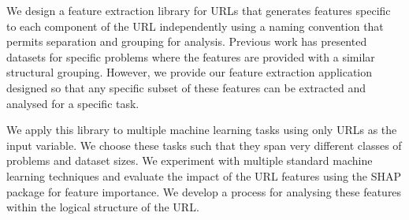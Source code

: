 \documentclass{aircc}
\begin{document}
\begin{table}
\caption{URL Components and Feature Information}
\label{tab:components}
\end{table}

We design a feature extraction library for URLs that generates features specific 
to each component of the URL independently using a naming convention that permits 
separation and grouping for analysis.
Previous work has presented datasets for specific problems where the features
are provided with a similar structural grouping\cite{Vrban2020}. However, we provide 
our feature extraction application designed so that any specific subset of these 
features can be extracted and analysed for a specific task.

We apply this library to multiple machine learning tasks using only URLs as the 
input variable. We choose these tasks such that they span very different classes 
of problems and dataset sizes. We experiment with multiple standard machine 
learning techniques and evaluate the impact of the URL features using the SHAP 
package for feature importance. We develop a process
for analysing these features within the logical structure of the URL.
\end{document}
